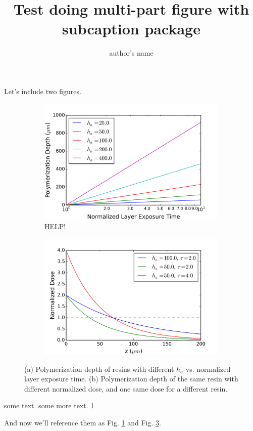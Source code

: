 \documentclass[12pt]{article}
\title{Test doing multi-part figure with subcaption package}
\author{author's name}
\date{}
\begin{document}
\maketitle

\noindent Let's include two figures.

\begin{figure}[h]
\centering
\begin{subfigure} {0.5\textwidth}
  \includegraphics[width=\linewidth]{figures/beerslaw1.png}
   \caption{HELP!} \label{fgr:beerslaw1}
\end{subfigure}
\begin{subfigure} {0.5\textwidth}
  \includegraphics[width=\linewidth]{figures/beerslaw2.png}
   \caption{} \label{fgr:beerslaw2}
\end{subfigure}
\caption{(a) Polymerization depth of resins with different $h_a$ vs. normalized layer exposure time. (b) Polymerization depth of the same resin with different normalized dose, and one same dose for a different resin.}
\end{figure}

some text. some more text. \ref{fgr:beerslaw1}

\noindent And now we'll reference them as Fig. \ref{fgr:beerslaw1} and Fig. \ref{fgr:beerslaw2}.
\end{document}
